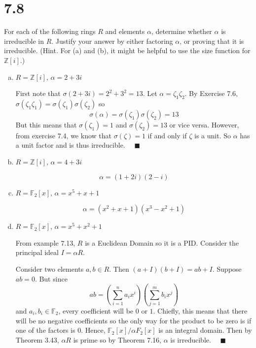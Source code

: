 \documentclass[12pt]{article}
\newcommand{\F}{\mathbb{F}}
\newcommand{\Z}{\mathbb{Z}}
\newcommand{\qed}{\quad \blacksquare}
\begin{document}
\section*{7.8}
For each of the following rings $R$ and elements $\alpha$, determine whether $\alpha$ is irreducible in $R$. Justify your answer by either factoring $\alpha$, or proving that it is irreducible. (Hint. For (a) and (b), it might be helpful to use the size function for $\Z[i]$.)
\begin{enumerate}[(a)]
    \item $R = \Z[i]$, $\alpha = 2 + 3i$
    
        \color{blue}
            First note that $\sigma(2 + 3i) = 2^2 + 3^2 = 13$. Let $\alpha = \zeta_1 \zeta_2$. By Exercise 7.6, $\sigma(\zeta_1 \zeta_1) = \sigma(\zeta_1)\sigma(\zeta_2)$ so 
            \[\sigma(\alpha) = \sigma(\zeta_1)\sigma(\zeta_2) = 13\]
            But this means that $\sigma(\zeta_1) = 1$ and $\sigma(\zeta_2) = 13$ or vice versa. However, from exercise 7.4, we know that $\sigma(\zeta) = 1$ if and only if $\zeta$ is a unit. So $\alpha$ has a unit factor and is thus irreducible. $\qed$
        \color{black}

    \item $R = \Z[i]$, $\alpha = 4 + 3i$

        \color{blue}
           \[\alpha = (1 + 2i)(2 - i)\]
        \color{black}

    \item $R = \F_2[x]$, $\alpha = x^5 + x + 1$
    
        \color{blue}
            \[\alpha = (x^2 + x + 1)(x^3 - x^2 + 1)\]
        \color{black}

    \item $R = \F_2[x]$, $\alpha = x^5 + x^2 + 1$
    
        \color{blue}
            From example 7.13, $R$ is a Euclidean Domain so it is a PID. Consider the principal ideal $I = \alpha R$. 

            Consider two elements $a, b \in R$. Then $(a + I)(b + I) = ab + I$. Suppose $ab = 0$. But since 
            \[ab = \left(\sum_{i=1}^n a_ix^i\right)\left(\sum_{j=1}^m b_ix^j\right)\]
            and $a_i, b_i \in \F_2$, every coefficient will be $0$ or $1$. Chiefly, this means that there will be no negative coefficients so the only way for the product to be zero is if one of the factors is $0$. Hence, $\F_2[x]/\alpha F_2[x]$ is an integral domain. Then by  Theorem 3.43, $\alpha R$ is prime so by Theorem 7.16, $\alpha$ is irreducible. $\qed$
        \color{black}

\end{enumerate}
\pagebreak
\end{document}
